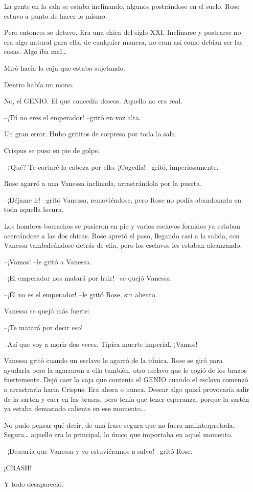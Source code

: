 La gente en la sala se estaba inclinando, algunos postrándose en el
suelo. Rose estuvo a punto de hacer lo mismo.

Pero entonces se detuvo. Era una chica del siglo XXI. Inclinarse y
postrarse no era algo natural para ella. de cualquier manera, no eran
así como debían ser las cosas. Algo iba mal\ldots{}

Miró hacia la caja que estaba sujetando.

Dentro había un mono.

No, el GENIO. El que concedía deseos. Aquello no era real.

--¡Tú no eres el emperador! --gritó en voz alta.

Un gran error. Hubo grititos de sorpresa por toda la sala.

Crispus se puso en pie de golpe.

--¿Qué? Te cortaré la cabeza por ello. ¡Cogedla! --gritó,
imperiosamente.

Rose agarró a una Vanessa inclinada, arrastrándola por la puerta.

--¡Déjame ir! --gritó Vanessa, removiéndose, pero Rose no podía
abandonarla en toda aquella locura.

Los hombres borrachos se pusieron en pie y varios esclavos fornidos ya
estaban acercándose a las dos chicas. Rose apretó el paso, llegando casi
a la salida, con Vanessa tambaleándose detrás de ella, pero los esclavos
les estaban alcanzando.

--¡Vamos! --le gritó a Vanessa.

--¡El emperador nos matará por huir! --se quejó Vanessa.

--¡Él no es el emperador! --le gritó Rose, sin aliento.

Vanessa se quejó más fuerte:

--¡Te matará por decir eso!

--Así que voy a morir dos veces. Típica muerte imperial. ¡Vamos!

Vanessa gritó cuando un esclavo le agarró de la túnica. Rose se giró
para ayudarla pero la agarraron a ella también, otro esclavo que le
cogió de los brazos fuertemente. Dejó caer la caja que contenía el GENIO
cuando el esclavo comenzó a arrastrarla hacia Crispus. Era ahora o
nunca. Desear algo quizá provocaría salir de la sartén y caer en las
brasas, pero tenía que tener esperanza, porque la sartén ya estaba
demasiado caliente en ese momento\ldots{}

No pudo pensar qué decir, de una frase segura que no fuera
malinterpretada. Segura\ldots{} aquello era lo principal, lo único que
importaba en aquel momento.

--¡Desearía que Vanessa y yo estuviéramos a salvo! --gritó Rose.

¡CRASH!

Y todo desapareció.

